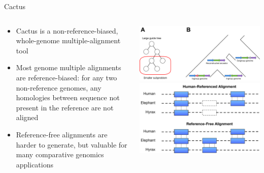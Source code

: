 \documentclass[10pt,
               hyperref={bookmarks=false,
                         bookmarksopen=false,
                         colorlinks=true,
                         linkcolor=blue,
                         urlcolor=blue},
               xcolor={svgnames,table}]{beamer}
\begin{document}
\begin{frame}{Cactus}
  \begin{columns}
    \begin{column}{0.5\textwidth}
      \begin{itemize}
          \item Cactus is a non-reference-biased, whole-genome multiple-alignment tool
          \item Most genome multiple alignments are reference-biased: for any two non-reference genomes, any homologies between sequence not present in the reference are not aligned
          \item Reference-free alignments are harder to generate, but valuable for many comparative genomics applications
      \end{itemize}
    \end{column}
    \begin{column}{0.5\textwidth}
      \includegraphics[width=\columnwidth]{images/progressive-alignment-and-reconstruction.pdf} \\
      \includegraphics[width=\columnwidth]{images/reference-free-diagram.pdf}
    \end{column}
  \end{columns}
\end{frame}
\end{document}
